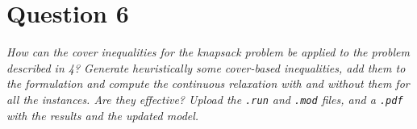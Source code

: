 \documentclass[10pt]{article}
\begin{document}
    \section*{Question 6}
    \textit{How can the cover inequalities for the knapsack problem be applied to the problem described in 4? Generate heuristically some cover-based inequalities, add them to the formulation and compute the continuous relaxation with and without them for all the instances. Are they effective? Upload the \texttt{.run} and \texttt{.mod} files, and a \texttt{.pdf} with the results and the updated model.}
\end{document}
